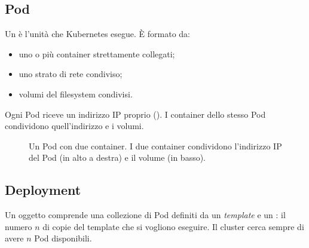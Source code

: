 \subsection{Pod}
\label{sec:k8s-pod}

\begin{definizione}[Pod]
Un  è l'unità che Kubernetes esegue. È formato da:
\begin{itemize}
  \item uno o più container strettamente collegati;
  \item uno strato di rete condiviso;
  \item volumi del filesystem condivisi.
\end{itemize}
\end{definizione}

Ogni Pod riceve un indirizzo IP proprio (). I container dello stesso Pod condividono quell'indirizzo
e i volumi.

\begin{figure}[ht]
\centering
{}
\caption{Un Pod con due container. I due container condividono l'indirizzo IP del Pod (in alto a destra) e il volume
(in basso).}
\label{fig:k8s-pod}
\end{figure}

\subsection{Deployment}
\label{sec:k8s-deployment}

\begin{definizione}[Deployment]
Un oggetto  comprende una collezione di Pod definiti da un \emph{template} e un : il numero $n$ di copie del template che si vogliono eseguire. Il cluster cerca sempre di avere $n$ Pod
disponibili.
\end{definizione}

